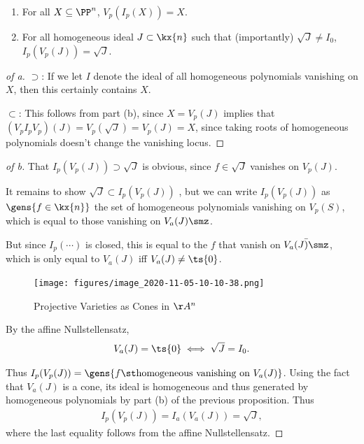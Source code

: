 \begin{proposition}

\envlist

\begin{enumerate}
\def\labelenumi{\alph{enumi}.}
\item
  For all \(X\subseteq \PP^n\), \(V_p(I_p(X)) = X\).
\item
  For all homogeneous ideal \(J\subset \kx{n}\) such that (importantly)
  \(\sqrt{J} \neq I_0\), \(I_p(V_p(J)) = \sqrt J\).
\end{enumerate}

\end{proposition}

\begin{proof}[of a]

\(\supset\): If we let \(I\) denote the ideal of all homogeneous
polynomials vanishing on \(X\), then this certainly contains \(X\).

\(\subset\): This follows from part (b), since \(X = V_p(J)\) implies
that \((V_p I_p V_p)(J) = V_p(\sqrt J) = V_p(J) = X\), since taking
roots of homogeneous polynomials doesn't change the vanishing locus.

\end{proof}

\begin{proof}[of b]

That \(I_p(V_p(J)) \supset \sqrt J\) is obvious, since \(f\in \sqrt{J}\)
vanishes on \(V_p(J)\). 

It remains to show \(\sqrt{J} \subset I_p(V_p(J))\) , but we can write
\(I_p(V_p(J))\) as \(\gens{f \in \kx{n}}\) the set of homogeneous
polynomials vanishing on \(V_p(S)\), which is equal to those vanishing
on \(V_a(J) \smz\).

But since \(I_p(\cdots)\) is closed, this is equal to the \(f\) that
vanish on \(\bar{V_a(J)\smz}\), which is only equal to \(V_a(J)\) iff
\(V_a(J) \neq \ts{0}\).

\begin{figure}
\centering
\texttt{[image: figures/image\_2020-11-05-10-10-38.png]}
\caption{Projective Varieties as Cones in \(\AA^n\)}
\end{figure}

By the affine Nullstellensatz,
\begin{align*}  
V_a(J) = \ts{0} \iff \sqrt{J} = I_0
.\end{align*}

Thus
\(I_p(V_p(J)) = \gens{f \st \text{homogeneous vanishing on }V_a(J)}\).
Using the fact that \(V_a(J)\) is a cone, its ideal is homogeneous and
thus generated by homogeneous polynomials by part (b) of the previous
proposition. Thus
\begin{align*}  
I_p(V_p(J)) = I_a(V_a(J)) = \sqrt J
,\end{align*} where the last equality follows from the affine
Nullstellensatz.

\end{proof}


